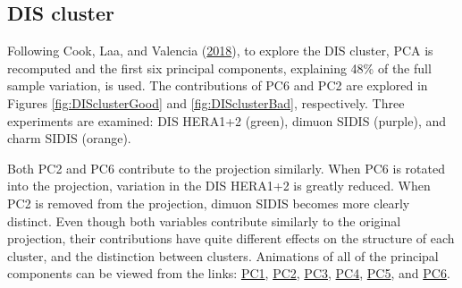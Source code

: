 \hypertarget{dis-cluster}{%
\subsection{DIS cluster}\label{dis-cluster}}

Following Cook, Laa, and Valencia
(\protect\hyperlink{ref-cook_dynamical_2018}{2018}), to explore the DIS
cluster, PCA is recomputed and the first six principal components,
explaining 48\% of the full sample variation, is used. The contributions
of PC6 and PC2 are explored in Figures \ref{fig:DISclusterGood} and
\ref{fig:DISclusterBad}, respectively. Three experiments are examined:
DIS HERA1+2 (green), dimuon SIDIS (purple), and charm SIDIS (orange).

Both PC2 and PC6 contribute to the projection similarly. When PC6 is
rotated into the projection, variation in the DIS HERA1+2 is greatly
reduced. When PC2 is removed from the projection, dimuon SIDIS becomes
more clearly distinct. Even though both variables contribute similarly
to the original projection, their contributions have quite different
effects on the structure of each cluster, and the distinction between
clusters. Animations of all of the principal components can be viewed
from the links:
\href{https://nspyrison.netlify.com/thesis/discluster_manualtour_pc1/}{PC1},
\href{https://nspyrison.netlify.com/thesis/discluster_manualtour_pc2/}{PC2},
\href{https://nspyrison.netlify.com/thesis/discluster_manualtour_pc3/}{PC3},
\href{https://nspyrison.netlify.com/thesis/discluster_manualtour_pc4/}{PC4},
\href{https://nspyrison.netlify.com/thesis/discluster_manualtour_pc5/}{PC5},
and
\href{https://nspyrison.netlify.com/thesis/discluster_manualtour_pc6/}{PC6}.


